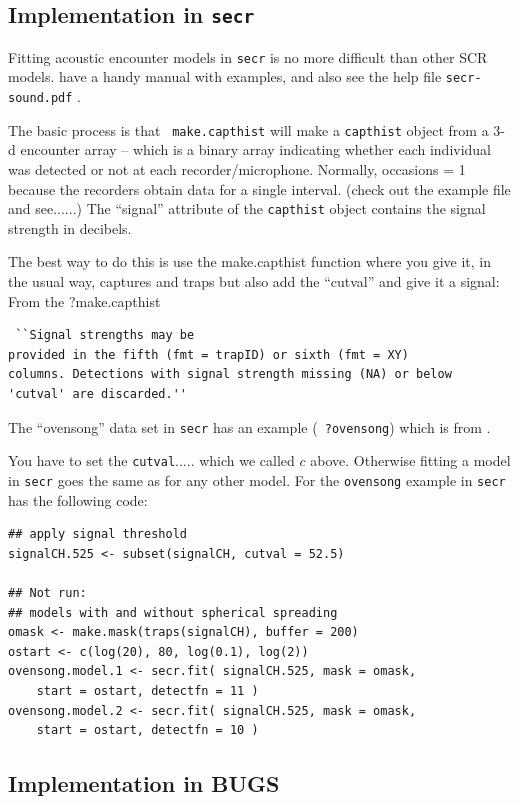 \subsection{Implementation in \mbox{\tt secr}}

Fitting acoustic encounter models in \mbox{\tt secr} is no more
difficult than other SCR models. \citet{efford_dawson:2010} have a
handy manual with examples, and also see the help file 
\mbox{\tt secr-sound.pdf} \citep{efford_dawson:2010}.


The basic process is that \mbox{\tt 
make.capthist} will make a \mbox{\tt capthist} object from a 3-d encounter
array  -- which is a binary array indicating whether each individual
was
detected or not at each recorder/microphone. Normally, 
occasions = 1 because the recorders obtain data for a single
interval.  (check out the example file and see......)
The ``signal'' attribute of the \mbox{\tt capthist} object contains the signal
strength in decibels. 

The best way to do this is use the make.capthist function where you
give it, in the usual way, captures and traps but also add the
``cutval'' and give it a signal:
From the ?make.capthist \begin{verbatim} ``Signal strengths may be
provided in the fifth (fmt = trapID) or sixth (fmt = XY)
columns. Detections with signal strength missing (NA) or below
'cutval' are discarded.'' \end{verbatim}


The ``ovensong'' data set in \mbox{\tt secr} has an example (\mbox{\tt
  ?ovensong}) which is from \citep{dawson_efford:2009}.

You have to set the \mbox{\tt cutval}..... which we called $c$ above.
Otherwise fitting a model in \mbox{\tt secr} goes the same as for any
other model. For the \mbox{\tt ovensong} example in \mbox{\tt secr}
has the following code:
\begin{verbatim}
## apply signal threshold
signalCH.525 <- subset(signalCH, cutval = 52.5)

## Not run: 
## models with and without spherical spreading
omask <- make.mask(traps(signalCH), buffer = 200)
ostart <- c(log(20), 80, log(0.1), log(2))
ovensong.model.1 <- secr.fit( signalCH.525, mask = omask, 
    start = ostart, detectfn = 11 ) 
ovensong.model.2 <- secr.fit( signalCH.525, mask = omask, 
    start = ostart, detectfn = 10 ) 
\end{verbatim}



\subsection{Implementation in {\bf BUGS}}

